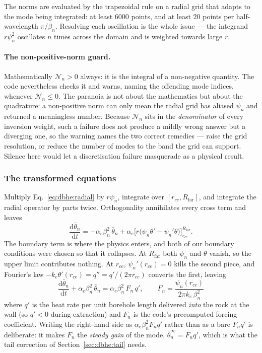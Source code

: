 The norms are evaluated by the trapezoidal rule on a radial grid that adapts to
the mode being integrated: at least $6000$ points, and at least $20$ points per
half-wavelength $\pi/\beta_n$. Resolving each oscillation is the whole issue ---
the integrand $r\psi_n^2$ oscillates $n$ times across the domain and is weighted
towards large $r$.

\paragraph{The non-positive-norm guard.}
Mathematically $\mathcal{N}_n>0$ always: it is the integral of a non-negative
quantity. The code nevertheless checks it and warns, naming the offending mode
indices, whenever $\mathcal{N}_n\le0$. The paranoia is not about the mathematics
but about the quadrature: a non-positive norm can only mean the radial grid has
aliased $\psi_n$ and returned a meaningless number. Because $\mathcal{N}_n$ sits
in the \emph{denominator} of every inversion weight, such a failure does not
produce a mildly wrong answer but a diverging one, so the warning names the two
correct remedies --- raise the grid resolution, or reduce the number of modes to
the band the grid can support. Silence here would let a discretisation failure
masquerade as a physical result.

\subsubsection{The transformed equations}
Multiply Eq.~\eqref{eq:dbhe:radial} by $r\psi_n$, integrate over
$[r_{ce},R_{\mathrm{far}}]$, and integrate the radial operator by parts twice.
Orthogonality annihilates every cross term and leaves
\begin{equation}
\frac{\mathrm{d}\bar\theta_n}{\mathrm{d}t} =-\alpha_e\beta_n^{2}\,\bar\theta_n
+\alpha_e\Big[r\big(\psi_n\theta'-\psi_n'\theta\big)\Big]_{r_{ce}}^{R_{\mathrm{far}}} .
\label{eq:dbhe:proj}
\end{equation}
The boundary term is where the physics enters, and both of our boundary
conditions were chosen so that it collapses. At $R_{\mathrm{far}}$ both
$\psi_n$ and $\theta$ vanish, so the upper limit contributes nothing. At
$r_{ce}$, $\psi_n'(r_{ce})=0$ kills the second piece, and Fourier's law
$-k_e\theta'(r_{ce})=q''=q'/(2\pi r_{ce})$ converts the first, leaving
\begin{equation}
\boxed{\; \frac{\mathrm{d}\bar\theta_n}{\mathrm{d}t}+\alpha_e\beta_n^{2}\,\bar\theta_n
=\alpha_e\beta_n^{2}\,F_n\,q' , \qquad F_n=\frac{\psi_n(r_{ce})}{2\pi k_e\,\beta_n^{2}} \; }
\label{eq:dbhe:modeODE}
\end{equation}
where $q'$ is the heat rate per unit borehole length delivered \emph{into} the
rock at the wall (so $q'<0$ during extraction) and $F_n$ is the code's
precomputed forcing coefficient. Writing the right-hand side as
$\alpha_e\beta_n^2 F_n q'$ rather than as a bare $F_n q'$ is deliberate: it makes
$F_n$ the \emph{steady gain} of the mode, $\bar\theta_n^\infty=F_n q'$, which is
what the tail correction of Section~\ref{sec:dbhe:tail} needs.

